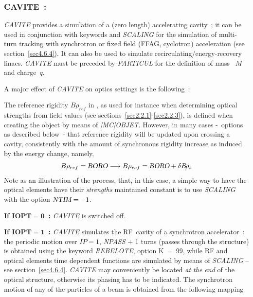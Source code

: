 {\subsubsection*{CAVITE~: \CAVITETitl}  \label{CAVITE}
\medskip

\textsl{CAVITE}  provides a  simulation of a (zero length)
accelerating cavity~; it can be used in conjunction with  keywords \REBELOTE{} 
and \textsl{SCALING} for 
the simulation of multi-turn tracking with synchrotron or 
fixed field (FFAG, cyclotron)   acceleration (see section~\ref{sec4.6.4}). 
It can also be used to simulate recirculating/energy-recovery linacs. 
\textsl{CAVITE}  must be preceded by \textsl{PARTICUL} for the definition 
of mass ~$ M $ and charge~$ q$.   

\bigskip

\noindent A major effect of \textsl{CAVITE} on optics settings is the following~:   

\medskip

\noindent The reference rigidity $B\rho_{ref} $  in \zgou, as used for instance 
when determining optical strengths from field values (see sections~\ref{sec2.2.1}-\ref{sec2.2.3}), 
 is defined when creating the object  by means of \textsl{[MC]OBJET}.  However, in many 
cases -~options as described below~- that  reference rigidity will be updated upon crossing a cavity, 
consistently with the amount of synchronous rigidity increase as induced by the energy change, namely, 
\begin{equation}
\label{EqBORORef}
B\rho_{ref} = \BORO \longrightarrow B\rho_{ref} = \BORO + \delta \Br_s 
\index{BORO@{\BORO}$\times D_{ref}$|textbf} \index{BORORef@$B\rho_{ref}$|textbf}
\end{equation}
Note as an illustration of the process, that, in this case, a simple way to have the 
optical elements have their \textsl{strengths} maintained constant is to 
use \textsl{SCALING} with the option $\textsl{NTIM}=-1$.

\bigskip

\noindent \textbf{If $\mathbf{IOPT  =  0}$~:}   \textsl{CAVITE} is switched off.  
\bigskip

\noindent\textbf{If $\mathbf{IOPT  =  1}$~:}  \textsl{CAVITE} simulates the RF~cavity of a 
synchrotron accelerator~: 
the periodic motion over $IP  = 1$, \textsl{NPASS} + 1 
turns (passes through the structure) is obtained using the keyword \textsl{REBELOTE}, option 
\mbox{K  =  99},  while  RF  and optical elements  time dependent functions are simulated by means of
\textsl{SCALING} -- see section~\ref{sec4.6.4}. 
 \textsl{CAVITE} may conveniently be located  \textsl{at the end} of the optical 
structure, otherwise its phasing has to be indicated. 
The synchrotron motion of any of the 
\IMAX{} particles of a beam is obtained from  the following mapping 

}
